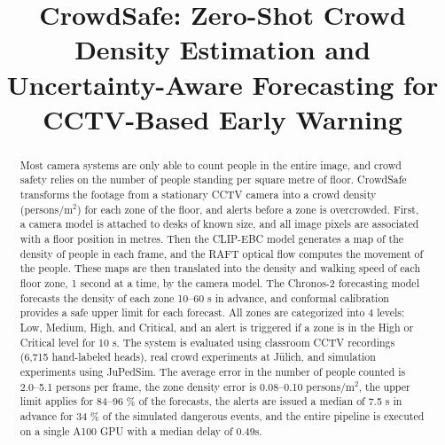 \documentclass[conference]{IEEEtran}
\newcommand{\pmsq}{persons/m$^2$}
\begin{document}
\title{CrowdSafe: Zero-Shot Crowd Density Estimation and\\ Uncertainty-Aware Forecasting for CCTV-Based Early Warning}

\author{
\and
{}
\and
{}
\and
{}
\and
{}
}

\maketitle

\begin{abstract}
Most camera systems are only able to count people in the entire image, and crowd safety relies on the number of people standing per square metre of floor. CrowdSafe transforms the footage from a stationary CCTV camera into a crowd density (\pmsq{}) for each zone of the floor, and alerts before a zone is overcrowded. First, a camera model is attached to desks of known size, and all image pixels are associated with a floor position in metres. Then the CLIP-EBC model generates a map of the density of people in each frame, and the RAFT optical flow computes the movement of the people. These maps are then translated into the density and walking speed of each floor zone, 1 second at a time, by the camera model. The Chronos-2 forecasting model forecasts the density of each zone 10--60 s in advance, and conformal calibration provides a safe upper limit for each forecast. All zones are categorized into 4 levels: Low, Medium, High, and Critical, and an alert is triggered if a zone is in the High or Critical level for 10 s. The system is evaluated using classroom CCTV recordings (6,715 hand-labeled heads), real crowd experiments at J\"ulich, and simulation experiments using JuPedSim. The average error in the number of people counted is 2.0--5.1 persons per frame, the zone density error is 0.08--0.10 persons/m$^{2}$, the upper limit applies for 84--96 \% of the forecasts, the alerts are issued a median of 7.5 s in advance for 34 \% of the simulated dangerous events, and the entire pipeline is executed on a single A100 GPU with a median delay of 0.49s.
\end{abstract}
\end{document}
